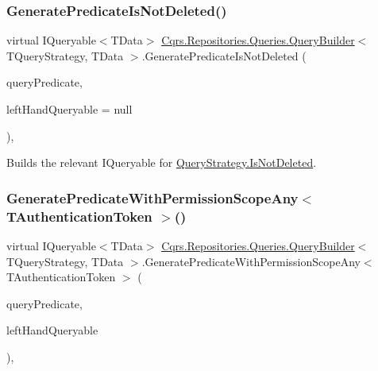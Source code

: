 \subsubsection{\texorpdfstring{Generate\+Predicate\+Is\+Not\+Deleted()}{GeneratePredicateIsNotDeleted()}}
{\footnotesize\ttfamily virtual I\+Queryable$<$T\+Data$>$ \hyperlink{classCqrs_1_1Repositories_1_1Queries_1_1QueryBuilder}{Cqrs.\+Repositories.\+Queries.\+Query\+Builder}$<$ T\+Query\+Strategy, T\+Data $>$.Generate\+Predicate\+Is\+Not\+Deleted (\begin{DoxyParamCaption}\item[{\hyperlink{classCqrs_1_1Repositories_1_1Queries_1_1QueryPredicate}{Query\+Predicate}}]{query\+Predicate,  }\item[{I\+Queryable$<$ T\+Data $>$}]{left\+Hand\+Queryable = {\ttfamily null} }\end{DoxyParamCaption})\hspace{0.3cm}{\ttfamily [protected]}, {\ttfamily [virtual]}}



Builds the relevant I\+Queryable for \hyperlink{classCqrs_1_1Repositories_1_1Queries_1_1QueryStrategy_aa872cafb9c17c9ea9d933be2ba209a6b_aa872cafb9c17c9ea9d933be2ba209a6b}{Query\+Strategy.\+Is\+Not\+Deleted}. 

\mbox{\label{classCqrs_1_1Repositories_1_1Queries_1_1QueryBuilder_a7768a63fd46f991f87a00b51484c2f34_a7768a63fd46f991f87a00b51484c2f34}} 
\subsubsection{\texorpdfstring{Generate\+Predicate\+With\+Permission\+Scope\+Any$<$ T\+Authentication\+Token $>$()}{GeneratePredicateWithPermissionScopeAny< TAuthenticationToken >()}}
{\footnotesize\ttfamily virtual I\+Queryable$<$T\+Data$>$ \hyperlink{classCqrs_1_1Repositories_1_1Queries_1_1QueryBuilder}{Cqrs.\+Repositories.\+Queries.\+Query\+Builder}$<$ T\+Query\+Strategy, T\+Data $>$.Generate\+Predicate\+With\+Permission\+Scope\+Any$<$ T\+Authentication\+Token $>$ (\begin{DoxyParamCaption}\item[{\hyperlink{classCqrs_1_1Repositories_1_1Queries_1_1QueryPredicate}{Query\+Predicate}}]{query\+Predicate,  }\item[{I\+Queryable$<$ T\+Data $>$}]{left\+Hand\+Queryable }\end{DoxyParamCaption})\hspace{0.3cm}{\ttfamily [protected]}, {\ttfamily [virtual]}}



